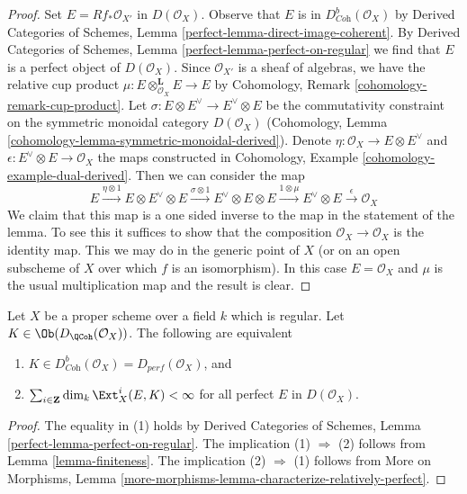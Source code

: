 \begin{proof}
Set $E = Rf_*\mathcal{O}_{X'}$ in $D(\mathcal{O}_X)$.
Observe that $E$ is in $D^b_{\textit{Coh}}(\mathcal{O}_X)$ by
Derived Categories of Schemes, Lemma \ref{perfect-lemma-direct-image-coherent}.
By 
Derived Categories of Schemes, Lemma \ref{perfect-lemma-perfect-on-regular}
we find that $E$ is a perfect object of $D(\mathcal{O}_X)$.
Since $\mathcal{O}_{X'}$ is a sheaf of algebras, we have the
relative cup product $\mu : E \otimes_{\mathcal{O}_X}^\mathbf{L} E \to E$
by Cohomology, Remark \ref{cohomology-remark-cup-product}.
Let $\sigma : E \otimes E^\vee \to E^\vee \otimes E$ be the commutativity
constraint on the symmetric monoidal category $D(\mathcal{O}_X)$
(Cohomology, Lemma \ref{cohomology-lemma-symmetric-monoidal-derived}).
Denote $\eta : \mathcal{O}_X \to E \otimes E^\vee$ and
$\epsilon : E^\vee \otimes E \to \mathcal{O}_X$ the maps
constructed in Cohomology, Example \ref{cohomology-example-dual-derived}.
Then we can consider the map
$$
E \xrightarrow{\eta \otimes 1} E \otimes E^\vee \otimes E
\xrightarrow{\sigma \otimes 1} E^\vee \otimes E \otimes E
\xrightarrow{1 \otimes \mu} E^\vee \otimes E
\xrightarrow{\epsilon} \mathcal{O}_X
$$
We claim that this map is a one sided inverse to the map in the
statement of the lemma. To see this it suffices to show that
the composition $\mathcal{O}_X \to \mathcal{O}_X$ is the identity
map. This we may do in the generic point of $X$ (or on an open
subscheme of $X$ over which $f$ is an isomorphism). In this
case $E = \mathcal{O}_X$ and $\mu$ is the usual multiplication map
and the result is clear.
\end{proof}

\begin{lemma}
\label{lemma-characterize-dbcoh-proper-regular}
Let $X$ be a proper scheme over a field $k$ which is regular. Let
$K \in \Ob(D_\QCoh(\mathcal{O}_X))$. The following are equivalent
\begin{enumerate}
\item $K \in D^b_{\textit{Coh}}(\mathcal{O}_X) = D_{perf}(\mathcal{O}_X)$, and
\item $\sum_{i \in \mathbf{Z}} \dim_k \Ext^i_X(E, K) < \infty$
for all perfect $E$ in $D(\mathcal{O}_X)$.
\end{enumerate}
\end{lemma}

\begin{proof}
The equality in (1) holds by Derived Categories of Schemes,
Lemma \ref{perfect-lemma-perfect-on-regular}.
The implication (1) $\Rightarrow$ (2) follows from
Lemma \ref{lemma-finiteness}.
The implication (2) $\Rightarrow$ (1) follows from
More on Morphisms, Lemma
\ref{more-morphisms-lemma-characterize-relatively-perfect}.
\end{proof}

